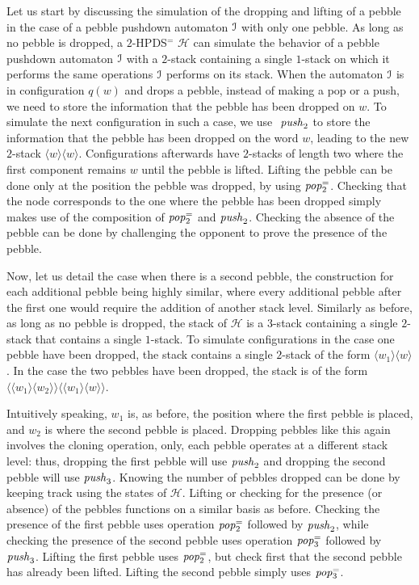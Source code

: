 \documentclass[a4paper,UKenglish,cleveref, autoref, thm-restate]{lipics-v2021}
\renewcommand{\H}{\mathcal{H}}
\begin{document}
{Let us start by discussing the simulation of the dropping and lifting of a pebble in the case of
a pebble pushdown automaton $\mathcal{I}$ with only one pebble.
As long as no pebble is dropped, a $2$-HPDS$^=$ $\H$ can simulate 
the behavior of a pebble pushdown automaton $\mathcal{I}$ with a $2$-stack containing a single $1$-stack
on which it performs the same operations $\mathcal{I}$ performs on its stack.
When the automaton $\mathcal{I}$ is in configuration $q(w)$ and drops a pebble, instead of making a pop or a push, we need
to %
	store the information that the pebble has been
dropped on $w$.
To simulate the next configuration in such a case, we use 
$\text{\textit{ push}}_2$
to store the information that the pebble has been dropped on the word $w$, leading to the new  $2$-stack
$\langle w \rangle \langle w \rangle$. 
Configurations afterwards have $2$-stacks of length two where the first component remains
$w$ until the pebble is lifted.
Lifting the pebble can be done only at the position the
pebble was dropped, by using $\text{\textit{pop}}^=_2$.
Checking that the node
corresponds to the one where the pebble has been dropped simply makes use of
the composition of $\text{\textit{pop}}^=_2$ and $\text{\textit{push}}_2$.
Checking the absence of the pebble can be done by challenging
the opponent to prove the presence of the pebble.

Now, let us detail the case when there is a second pebble, the construction
for each additional pebble being highly similar, where every additional pebble after
the first one would require the addition of another stack level.
Similarly as before, 
as long as no pebble is dropped, the stack of $\H$ 
is a $3$-stack containing a
single $2$-stack that contains a single $1$-stack.
To simulate configurations in the case one pebble have been dropped, the stack contains a single
 $2$-stack of the form $\langle w_1 \rangle \langle w \rangle$.
In the case the two pebbles have been dropped, 
the stack is of the form $ \langle \langle w_1 \rangle \langle w_2 \rangle \rangle
\langle \langle w_1 \rangle \langle w \rangle \rangle$. 



Intuitively speaking, $w_1$ is, as before, the position where the first pebble is
placed, and $w_2$ is where the second pebble is placed. Dropping pebbles like this
again involves the cloning operation, only, each pebble operates at a different 
stack level: thus, dropping the first pebble will use $\text{\textit{push}}_2$
and dropping the second pebble will use $\text{\textit{push}}_3$. Knowing the number of pebbles dropped can be done by 
keeping track using the states of $\H$.
Lifting or
checking for the presence 
(or absence) 
of the pebbles functions on a similar
basis as before. Checking the presence of the first pebble uses 
operation $\text{\textit{pop}}^=_2$ followed by $\text{\textit{push}}_2$,
while checking the presence of the second pebble uses 
operation $\text{\textit{pop}}^=_3$ followed by $\text{\textit{push}}_3$.
Lifting the first pebble uses $\text{\textit{pop}}^=_2$, but
check first that the second pebble has already been lifted.
Lifting the second pebble simply uses $\text{\textit{pop}}^=_3$.


}
\end{document}
